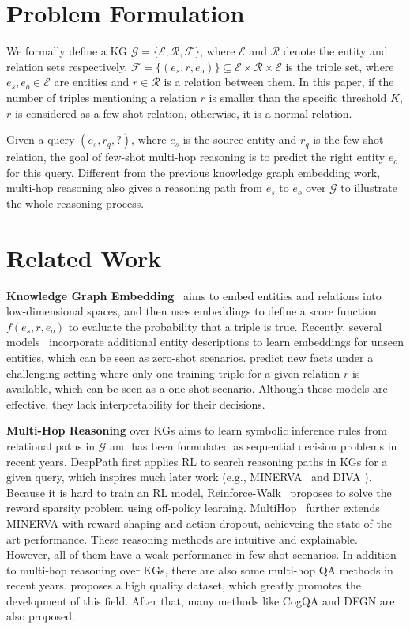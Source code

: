 \documentclass[11pt,a4paper]{article}
\begin{document}
\section{Problem Formulation}
\label{problem}

We formally define a KG $\mathcal{G} = \{\mathcal{E}, \mathcal{R}, \mathcal{F}\}$, where $\mathcal{E}$ and $\mathcal{R}$ denote the entity and relation sets respectively. $\mathcal{F} = \{(e_s, r, e_o)\} \subseteq \mathcal{E} \times \mathcal{R} \times \mathcal{E}$ is the triple set, where $e_s, e_o \in \mathcal{E}$ are entities and $r \in \mathcal{R}$ is a relation between them. In this paper, if the number of triples mentioning a relation $r$ is smaller than the specific threshold $K$, $r$ is considered as a few-shot relation, otherwise, it is a normal relation.

Given a query $(e_s, r_q, ?)$, where $e_s$ is the source entity and $r_q$ is the few-shot relation, the goal of few-shot multi-hop reasoning is to predict the right entity $e_o$ for this query. Different from the previous knowledge graph embedding work, multi-hop reasoning also gives a reasoning path from $e_s$ to $e_o$ over $\mathcal{G}$ to illustrate the whole reasoning process.

\section{Related Work}

\textbf{Knowledge Graph Embedding}~\cite{TransE,DistMult,ConvE} aims to embed entities and relations into low-dimensional spaces, and then uses embeddings to define a score function $f(e_s, r, e_o)$ to evaluate the probability that a triple is true. Recently, several models~\cite{DKRL,shi2018open} incorporate additional entity descriptions to learn embeddings for unseen entities, which can be seen as zero-shot scenarios. \citet{one-shot} predict new facts under a challenging setting where only one training triple for a given relation $r$ is available, which can be seen as a one-shot scenario. Although these models are effective, they lack interpretability for their decisions.

\textbf{Multi-Hop Reasoning} over KGs aims to learn symbolic inference rules from relational paths in $\mathcal{G}$ and has been formulated as sequential decision problems in recent years. DeepPath \cite{DeepPath} first applies RL to search reasoning paths in KGs for a given query, which inspires much later work (e.g., MINERVA~\cite{MINERVA} and DIVA \cite{chen2018variational}). Because it is hard to train an RL model, Reinforce-Walk~\cite{shen2018reinforcewalk} proposes to solve the reward sparsity problem using off-policy learning. MultiHop~\cite{MultiHop} further extends MINERVA with reward shaping and action dropout, 
achieveing the state-of-the-art performance. These reasoning methods are intuitive and explainable. However, all of them have a weak performance in few-shot scenarios. In addition to multi-hop reasoning over KGs, there are also some multi-hop QA methods in recent years. \citet{yang2018hotpotqa} proposes a high quality dataset, which greatly promotes the development of this field. After that, many methods like CogQA \cite{CogQA} and DFGN \cite{DFGN} are also proposed.
\end{document}
